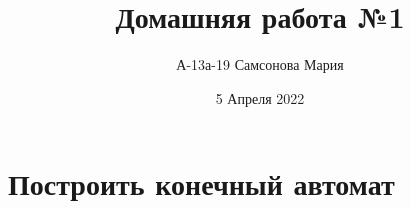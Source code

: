 \documentclass{article}
\title{Домашняя работа №1}
\author{А-13а-19 Самсонова Мария}
\date{5 Апреля 2022}
\begin{document}
\maketitle

\section{Построить конечный автомат}
\end{document}
